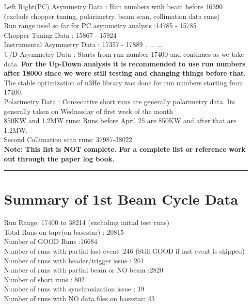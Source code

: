\documentclass[12pt]{article}
\begin{document}
Left Right(PC) Asymmetry Data : Run numbers with beam before 16390 (exclude chopper tuning, polarimetry, beam scan, collimation data runs)\\

Run range used so far for PC asymmetry analysis :14785 - 15785  \\

Chopper Tuning Data : 15867 - 15924 \\

Instrumental Asymmetry Data : 17357 - 17889 , ... ... \\

U/D Asymmetry Data : Starts from run number 17400 and continues as we take data. \textbf {For the Up-Down analysis it is recommended to use run numbers after 18000 since we were still testing and changing things before that.}\\

The stable optimization of n3He library was done for run numbers starting from 17400. \\
  
Polarimetry Data : Consecutive short runs are generally polarimetry data. Its generally taken on Wednesday of first week of the month\\

850KW and 1.2MW runs: Runs before April 25 are 850KW and after that are 1.2MW.\\

Second Collimation scan runs: 37987-38022 \\
 
\textbf{ Note: This list is NOT complete. For a complete list or reference work out through the paper log book.} \\

\noindent
{\color{red} \rule{\linewidth}{1mm} }

\newpage
\section{Summary of 1st Beam Cycle Data}
Run Range: 17400 to 38214 (excluding initial test runs)\\
Total Runs on tape(on basestar) : 20815 \\
Number of GOOD Runs :16684 \\
Number of runs with partial last event :246 (Still GOOD if last event is skipped)\\
Number of runs with header/trigger issue : 201 \\
Number of runs with partial beam or NO beam :2820 \\
Number of short runs : 802 \\
Number of runs with synchronization issue : 19 \\
Number of runs with NO data files on basestar: 43 \\
   
\end{document}
